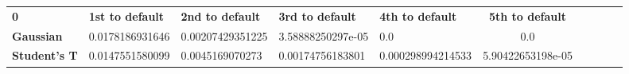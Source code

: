 \begin{tabular}{|l|l|l|l|l|c|c|c|c|c|}
\hline
\textbf{0} & \textbf{1st to default} & \textbf{2nd to default} & \textbf{3rd to default} & \textbf{4th to default} & \textbf{5th to default}\\\hhline{|=|=|=|=|=|=|}
\textbf{Gaussian} & 0.0178186931646 & 0.00207429351225 & 3.58888250297e-05 & 0.0 & 0.0\\
\textbf{Student's T} & 0.0147551580099 & 0.0045169070273 & 0.00174756183801 & 0.000298994214533 & 5.90422653198e-05\\
\hline
\end{tabular}
